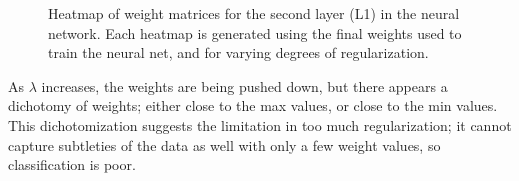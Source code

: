\documentclass{article}
\begin{document}
\begin{figure}[H]
\caption{Heatmap of weight matrices for the second layer (L1) in the neural network. Each heatmap is generated using the final weights used to train the neural net, and for varying degrees of regularization.}
\label{fig:L2}
\end{figure}

As $\lambda$ increases, the weights are being pushed down, but there appears a dichotomy of weights; either close to the max values, or close to the min values. This dichotomization suggests the limitation in too much regularization; it cannot capture subtleties of the data as well with only a few weight values, so classification is poor.
\end{document}
